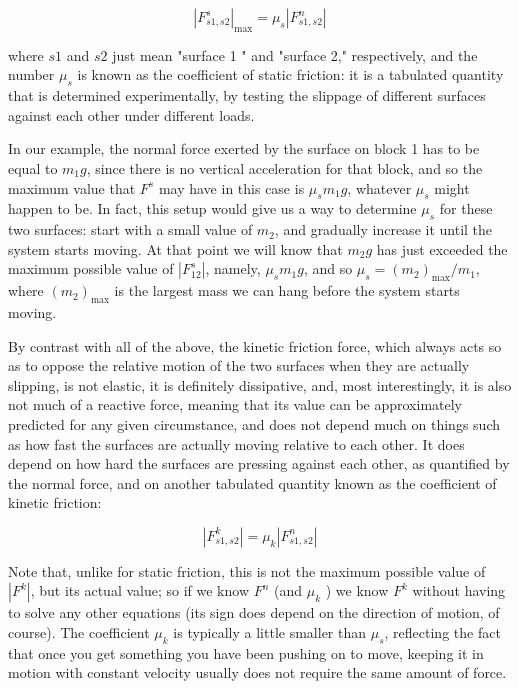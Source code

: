 \documentclass[10pt]{article}
\begin{document}
\begin{equation*}
\left|F_{s 1, s 2}^{s}\right|_{\max }=\mu_{s}\left|F_{s 1, s 2}^{n}\right| \tag{6.29}
\end{equation*}


where $s 1$ and $s 2$ just mean "surface 1 " and "surface 2," respectively, and the number $\mu_{s}$ is known as the coefficient of static friction: it is a tabulated quantity that is determined experimentally, by testing the slippage of different surfaces against each other under different loads.

In our example, the normal force exerted by the surface on block 1 has to be equal to $m_{1} g$, since there is no vertical acceleration for that block, and so the maximum value that $F^{s}$ may have in this case is $\mu_{s} m_{1} g$, whatever $\mu_{s}$ might happen to be. In fact, this setup would give us a way to determine $\mu_{s}$ for these two surfaces: start with a small value of $m_{2}$, and gradually increase it until the system starts moving. At that point we will know that $m_{2} g$ has just exceeded the maximum possible value of $\left|F_{12}^{s}\right|$, namely, $\mu_{s} m_{1} g$, and so $\mu_{s}=\left(m_{2}\right)_{\max } / m_{1}$, where $\left(m_{2}\right)_{\max }$ is the largest mass we can hang before the system starts moving.

By contrast with all of the above, the kinetic friction force, which always acts so as to oppose the relative motion of the two surfaces when they are actually slipping, is not elastic, it is definitely dissipative, and, most interestingly, it is also not much of a reactive force, meaning that its value can be approximately predicted for any given circumstance, and does not depend much on things such as how fast the surfaces are actually moving relative to each other. It does depend on how hard the surfaces are pressing against each other, as quantified by the normal force, and on another tabulated quantity known as the coefficient of kinetic friction:


\begin{equation*}
\left|F_{s 1, s 2}^{k}\right|=\mu_{k}\left|F_{s 1, s 2}^{n}\right| \tag{6.30}
\end{equation*}


Note that, unlike for static friction, this is not the maximum possible value of $\left|F^{k}\right|$, but its actual value; so if we know $F^{n}$ (and $\mu_{k}$ ) we know $F^{k}$ without having to solve any other equations (its sign does depend on the direction of motion, of course). The coefficient $\mu_{k}$ is typically a little smaller than $\mu_{s}$, reflecting the fact that once you get something you have been pushing on to move, keeping it in motion with constant velocity usually does not require the same amount of force.
\end{document}
